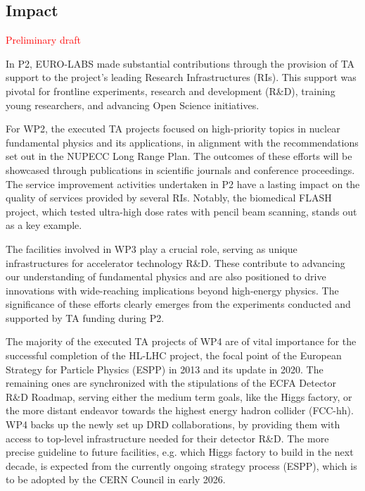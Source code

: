 
\subsection{Impact}
\label{sec:impact}

\textcolor{red}{Preliminary draft}

In P2, EURO-LABS made substantial contributions through the provision of TA support to the project's leading Research Infrastructures (RIs). This support was pivotal for frontline experiments, research and development (R\&D), training young researchers, and advancing Open Science initiatives.

For WP2, the executed TA projects focused on high-priority topics in nuclear fundamental physics and its applications, in alignment with the recommendations set out in the NUPECC Long Range Plan. The outcomes of these efforts will be showcased through publications in scientific journals and conference proceedings. The service improvement activities undertaken in P2 have a lasting impact on the quality of services provided by several RIs. Notably, the biomedical FLASH project, which tested ultra-high dose rates with pencil beam scanning, stands out as a key example.

The facilities involved in WP3 play a crucial role, serving as unique infrastructures for accelerator technology R\&D. These contribute to advancing our understanding of fundamental physics and are also positioned to drive innovations with wide-reaching implications beyond high-energy physics. The significance of these efforts clearly emerges from the experiments conducted and supported by TA funding during P2.


The majority of the executed TA projects of WP4 are of vital importance for the successful completion of the HL-LHC project, the focal point of the European Strategy for Particle Physics (ESPP) in 2013 and its update in 2020. The remaining ones are synchronized with the stipulations of the ECFA Detector R\&D Roadmap, serving either the medium term goals, like the Higgs factory, or the more distant endeavor towards the highest energy hadron collider (FCC-hh). WP4 backs up the newly set up DRD collaborations, by providing them with access to top-level infrastructure needed for their detector R\&D. The more precise guideline to future facilities, e.g. which Higgs factory to build in the next decade, is expected from the currently ongoing strategy process (ESPP), which is to be adopted by the CERN Council in early 2026.

